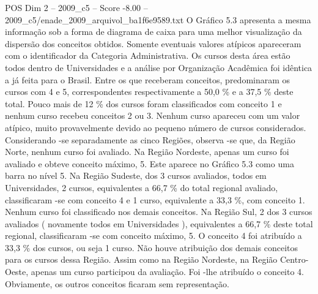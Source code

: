 \begin{textsample}{POS Dim 2 – 2009\_c5 – Score -8.00 – 2009\_c5/enade\_2009\_arquivol\_ba1f6e9589.txt}
O Gráfico 5.3 apresenta a mesma informação sob a forma de diagrama de caixa para uma melhor visualização da dispersão dos conceitos obtidos.
Somente eventuais valores atípicos apareceram com o identificador da Categoria Administrativa.
Os cursos desta área estão todos dentro de Universidades e a análise por Organização Acadêmica foi idêntica a já feita para o Brasil.
Entre os que receberam conceitos, predominaram os cursos com 4 e 5, correspondentes respectivamente a 50,0 \% e a 37,5 \% deste total.
Pouco mais de 12 \% dos cursos foram classificados com conceito 1 e nenhum curso recebeu conceitos 2 ou 3.
Nenhum curso apareceu com um valor atípico, muito provavelmente devido ao pequeno número de cursos considerados.
Considerando -se separadamente as cinco Regiões, observa -se que, da Região Norte, nenhum curso foi avaliado.
Na Região Nordeste, apenas um curso foi avaliado e obteve conceito máximo, 5.
Este aparece no Gráfico 5.3 como uma barra no nível 5.
Na Região Sudeste, dos 3 cursos avaliados, todos em Universidades, 2 cursos, equivalentes a 66,7 \% do total regional avaliado, classificaram -se com conceito 4 e 1 curso, equivalente a 33,3 \%, com conceito 1.
Nenhum curso foi classificado nos demais conceitos.
Na Região Sul, 2 dos 3 cursos avaliados ( novamente todos em Universidades ), equivalentes a 66,7 \% deste total regional, classificaram -se com conceito máximo, 5.
O conceito 4 foi atribuído a 33,3 \% dos cursos, ou seja 1 curso.
Não houve atribuição dos demais conceitos para os cursos dessa Região.
Assim como na Região Nordeste, na Região Centro-Oeste, apenas um curso participou da avaliação.
Foi -lhe atribuído o conceito 4.
Obviamente, os outros conceitos ficaram sem representação.

\end{textsample}
